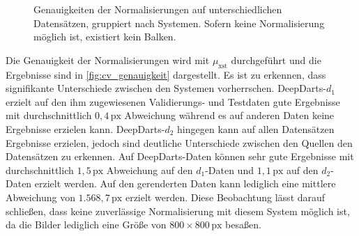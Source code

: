 \begin{figure}
    \centering
    \caption{Genauigkeiten der Normalisierungen auf unterschiedlichen Datensätzen, gruppiert nach Systemen. Sofern keine Normalisierung möglich ist, existiert kein Balken.}
    \label{fig:cv_genauigkeit}
\end{figure}

Die Genauigkeit der Normalisierungen wird mit $\mu_\text{xst}$ durchgeführt und die Ergebnisse sind in \autoref{fig:cv_genauigkeit} dargestellt. Es ist zu erkennen, dass signifikante Unterschiede zwischen den Systemen vorherrschen. DeepDarts-$d_1$ erzielt auf den ihm zugewiesenen Validierungs- und Testdaten gute Ergebnisse mit durchschnittlich $0,\!4\,\text{px}$ Abweichung während es auf anderen Daten keine Ergebnisse erzielen kann. DeepDarts-$d_2$ hingegen kann auf allen Datensätzen Ergebnisse erzielen, jedoch sind deutliche Unterschiede zwischen den Quellen den Datensätzen zu erkennen. Auf DeepDarts-Daten können sehr gute Ergebnisse mit durchschnittlich $1,\!5\,\text{px}$ Abweichung auf den $d_1$-Daten und $1,\!1\,\text{px}$ auf den $d_2$-Daten erzielt werden. Auf den gerenderten Daten kann lediglich eine mittlere Abweichung von $1.568,\!7\,\text{px}$ erzielt werden. Diese Beobachtung lässt darauf schließen, dass keine zuverlässige Normalisierung mit diesem System möglich ist, da die Bilder lediglich eine Größe von $800 \times 800\,\text{px}$ besaßen.

